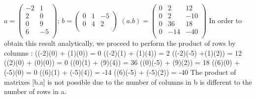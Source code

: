 \documentclass[12pt]{article}
\begin{document}
$a = \left(
\begin{array}{cc}
 -2 & 1 \\
 2 & 0 \\
 0 & 9 \\
 6 & -5 \\
\end{array}
\right) \text{; } b= \left(
\begin{array}{ccc}
 0 & 1 & -5 \\
 0 & 4 & 2 \\
\end{array}
\right)$ \vfill
$(a.b) = \left(
\begin{array}{ccc}
 0 & 2 & 12 \\
 0 & 2 & -10 \\
 0 & 36 & 18 \\
 0 & -14 & -40 \\
\end{array}
\right)$ \vfill
In order to obtain this result analytically, we proceed to perform the product of rows by columns : \vfill
((-2)(0) + (1)(0)) = 0 \thinspace ((-2)(1) + (1)(4)) = 2 \thinspace ((-2)(-5) +(1)(2)) = 12 \vfill
((2)(0) + (0)(0)) = 0 \thinspace ((0)(1) + (9)(4)) = 36 \thinspace ((0)(-5) + (9)(2)) = 18 \vfill((6)(0) + (-5)(0) = 0 \thinspace ((6)(1) + (-5)(4)) = -14 \thinspace ((6)(-5) + (-5)(2)) = -40 \vfill
The product of matrixes [b.a] is not possible due to the number of columns in b is different to the number of rows in a. 
\end{document}
